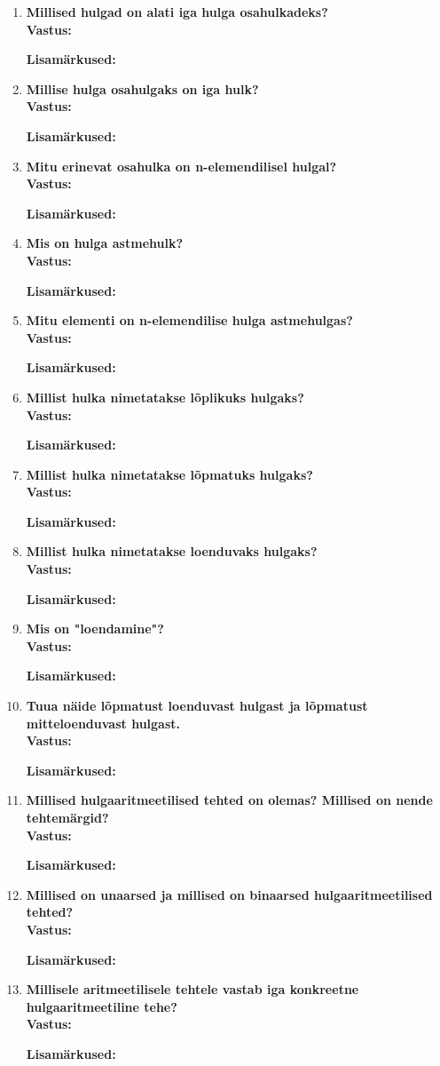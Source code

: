 \documentclass[a4paper,12pt]{article}
\makeatletter
\newenvironment{question}[1]{%
  \item \textbf{#1} \vspace{0.5em} \\ %
  \textbf{Vastus:} \vspace{0.25em} \\ %
  \def\@lisamarkused{} %
}{%
  \if\relax\detokenize\expandafter{\@lisamarkused}\relax %
  \else
    \vspace{0.5em} %
    \textbf{Lisamärkused:} \\ %
    \@lisamarkused %
  \fi
  \vspace{1em} %
}
\makeatother
\begin{document}
\begin{enumerate}[left=0pt]
\begin{question}{Millised hulgad on alati iga hulga osahulkadeks?}
\end{question}

\begin{question}{Millise hulga osahulgaks on iga hulk?}
\end{question}

\begin{question}{Mitu erinevat osahulka on n-elemendilisel hulgal?}
\end{question}

\begin{question}{Mis on hulga astmehulk?}
\end{question}

\begin{question}{Mitu elementi on n-elemendilise hulga astmehulgas?}
\end{question}

\begin{question}{Millist hulka nimetatakse lõplikuks hulgaks?}
\end{question}

\begin{question}{Millist hulka nimetatakse lõpmatuks hulgaks?}
\end{question}

\begin{question}{Millist hulka nimetatakse loenduvaks hulgaks?}
\end{question}

\begin{question}{Mis on "loendamine"?}
\end{question}

\begin{question}{Tuua näide lõpmatust loenduvast hulgast ja lõpmatust mitteloenduvast hulgast.}
\end{question}

\begin{question}{Millised hulgaaritmeetilised tehted on olemas? Millised on nende tehtemärgid?}
\end{question}

\begin{question}{Millised on unaarsed ja millised on binaarsed hulgaaritmeetilised tehted?}
\end{question}

\begin{question}{Millisele aritmeetilisele tehtele vastab iga konkreetne hulgaaritmeetiline tehe?}
\end{question}


\end{enumerate}
\end{document}

